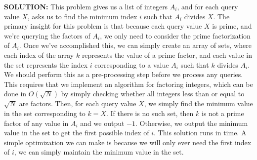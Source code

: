 \textbf{SOLUTION:}
\blank
This problem gives us a list of integers $A_i$, and for each query value $X$, asks us to find the minimum index $i$ such that $A_i$ divides $X$. The primary insight for this problem is that because each query value $X$ is prime, and we're querying the factors of $A_i$, we only need to consider the prime factorization of $A_i$.
\blank
Once we've accomplished this, we can simply create an array of sets, where each index of the array $k$ represents the value of a prime factor, and each value in the set represents the index $i$ corresponding to a value $A_i$ such that $k$ divides $A_i$. We should perform this as a pre-processing step before we process any queries. This requires that we implement an algorithm for factoring integers, which can be done in $O(\sqrt{N})$ by simply checking whether all integers less than or equal to $\sqrt{N}$ are factors.
\blank
Then, for each query value $X$, we simply find the minimum value in the set corresponding to $k = X$. If there is no such set, then $k$ is not a prime factor of any value in $A_i$ and we output $-1$. Otherwise, we output the minimum value in the set to get the first possible index of $i$. This solution runs in time.
\blank
A simple optimization we can make is because we will only ever need the first index of $i$, we can simply maintain the minimum value in the set.